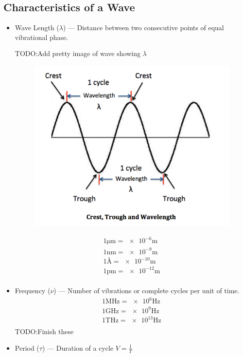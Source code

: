 \documentclass{article}[10pt]
\begin{document}
\subsection{Characteristics of a Wave}
\begin{itemize}
    \item Wave Length ($\lambda$) --- Distance between two consecutive points of
          equal vibrational phase.

          TODO:\@ Add pretty image of wave showing $\lambda$
          \begin{figure}[H]
          \includegraphics[scale=0.5]{lambdawave}
          \end{figure}

          \begin{align*}
              1\si{\micro\metre} = \num{e-6}\si{\metre} \\[0.5em]
              1\si{\nano\metre} = \num{e-9}\si{\metre}  \\[0.5em]
              1\si{\angstrom} = \num{e-10}\si{\metre}   \\[0.5em]
              1\si{\pico\metre} = \num{e-12}\si{\metre} \\[0.5em]
          \end{align*}
    \item Frequency ($\nu$) --- Number of vibrations or complete cycles per
          unit of time.
          \begin{align*}
              1\si{\mega\hertz} = \num{e6}\si{\hertz} \\[0.5em]
              1\si{\giga\hertz} = \num{e9}\si{\hertz} \\[0.5em]
              1\si{\tera\hertz} = \num{e13}\si{\hertz} \\[0.5em]              
          \end{align*}
          TODO:\@ Finish these
    \item Period ($\tau$) --- Duration of a cycle $V=\frac{1}{T}$
\end{itemize}
\end{document}
